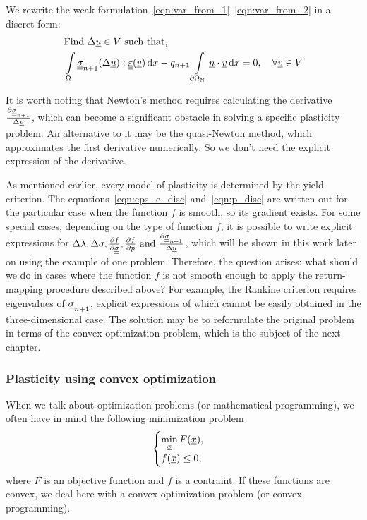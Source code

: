 \documentclass[12pt]{article}
\begin{document}
We rewrite the weak formulation~\ref{eqn:var_from_1}--\ref{eqn:var_from_2} in a discret form:
\begin{align}
    & \text{Find } \Delta\underline{u} \in V \text{ such that,} \label{eqn:var_from_1_disc} \\ 
    & \int\limits_\Omega\underline{\underline{\sigma}}_{n+1}(\Delta\underline{u}) : \underline{\underline{\varepsilon}}(\underline{v}) \, \mathrm{d} x - q_{n+1}\int\limits_{\partial\Omega_\text{N}}\underline{n} \cdot \underline{v} \, \mathrm{d} x = 0, \quad \forall \underline{v} \in V \label{eqn:var_from_2_disc}
\end{align}

It is worth noting that Newton's method requires calculating the derivative $\frac{\partial \underline{\underline{\sigma}}_{n+1}}{\Delta\underline{u}}$, which can become a significant obstacle in solving a specific plasticity problem. An alternative to it may be the quasi-Newton method, which approximates the first derivative numerically. So we don't need the explicit expression of the derivative.

As mentioned earlier, every model of plasticity is determined by the yield criterion. The equations~\ref{eqn:eps_e_disc} and~\ref{eqn:p_disc} are written out for the particular case when the function $f$ is smooth, so its gradient exists. For some special cases, depending on the type of function $f$, it is possible to write explicit expressions for $\Delta\lambda, \Delta\sigma, \frac{\partial f}{\partial \underline{\underline{\sigma}}}, \frac{\partial f}{\partial p} \text{ and } \frac{\partial \underline{\underline{\sigma}}_{n+1}}{\Delta\underline{u}}$, which will be shown in this work later on using the example of one problem. Therefore, the question arises: what should we do in cases where the function $f$ is not smooth enough to apply the return-mapping procedure described above? For example, the Rankine criterion requires eigenvalues of $\underline{\underline{\sigma}}_{n+1}$, explicit expressions of which cannot be easily obtained in the three-dimensional case. The solution may be to reformulate the original problem in terms of the convex optimization problem, which is the subject of the next chapter.

\subsubsection{Plasticity using convex optimization}

When we talk about optimization problems (or mathematical programming), we often have in mind the following minimization problem
\begin{equation}
    \begin{cases}
        \min\limits_{\underline{x}} F(\underline{x}),\\
        f(\underline{x}) \leq 0,
    \end{cases}
\end{equation}
where $F$ is an objective function and $f$ is a contraint. If these functions are convex, we deal here with a convex optimization problem (or convex programming). 
\end{document}
